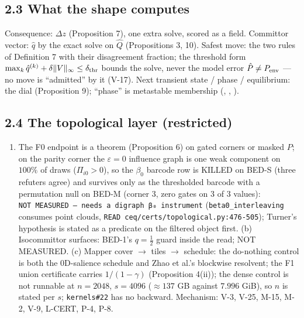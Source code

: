 \documentclass[11pt,a4paper]{article}
\theoremstyle{plain}
\theoremstyle{definition}
\theoremstyle{remark}
\providecommand{\tightlist}{%
  \setlength{\itemsep}{0pt}\setlength{\parskip}{0pt}}
\begin{document}
\subsection{2.3 What the shape computes}\label{what-the-shape-computes}

Consequence: \(\Delta z\) (Proposition 7), one extra solve, scored as a
field. Committor vector: \(\hat q\) by the exact solve on \(\hat Q\)
(Propositions 3, 10). Safest move: the two rules of Definition 7 with
their disagreement fraction; the threshold form
\(\max_k\hat q^{(k)}+\delta\|V\|_\infty\le\delta_{\rm thr}\) bounds the
solve, never the model error \(\hat P\ne P_{\rm env}\) --- no move is
``admitted'' by it (V-17). Next transient state / phase / equilibrium:
the dial (Proposition 9); ``phase'' is metastable membership
(\citep{prinz-2011-msm}, \citep{ramsauer-2021-hopfield},
\citep{erel-2025-attentionchains}).

\subsection{2.4 The topological layer
(restricted)}\label{the-topological-layer-restricted}

\begin{enumerate}
\def\labelenumi{(\alph{enumi})}
\tightlist
\item
  The F0 endpoint is a theorem (Proposition 6) on gated corners or
  masked \(P\); on the parity corner the \(\varepsilon=0\) influence
  graph is one weak component on \(100\%\) of draws (\(\Pi_{i0}>0\)), so
  the \(\beta_0\) barcode row is KILLED on BED-S (three refuters agree)
  and survives only as the thresholded barcode with a permutation null
  on BED-M (corner 3, zero gates on \(3\) of \(3\) values):
  \texttt{NOT\ MEASURED\ —\ needs\ a\ digraph\ β₀\ instrument}
  (\texttt{beta0\_interleaving} consumes point clouds,
  \texttt{READ\ ceq/certs/topological.py:476-505}); Turner's hypothesis
  is stated as a predicate on the filtered object first. (b)
  Isocommittor surfaces: BED-1's \(q=\tfrac12\) guard inside the read;
  NOT MEASURED. (c) Mapper cover \(\to\) tiles \(\to\) schedule: the
  do-nothing control is both the 0D-salience schedule and Zhao et al.'s
  blockwise resolvent; the F1 union certificate carries \(1/(1-\gamma)\)
  (Proposition 4(ii)); the dense control is not runnable at \(n=2048\),
  \(s=4096\) (\(\approx137\) GB against \(7.996\) GiB), so \(n\) is
  stated per \(s\); \texttt{kernels\#22} has no backward. Mechanism:
  V-3, V-25, M-15, M-2, V-9, L-CERT, P-4, P-8.
\end{enumerate}
\end{document}
